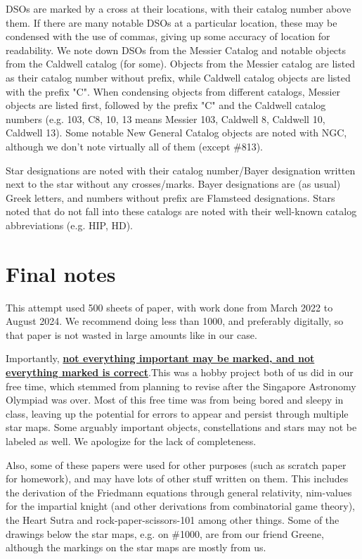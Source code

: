 \documentclass{article}
\begin{document}
DSOs are marked by a cross at their locations, with their catalog number above them. If there are many notable DSOs at a particular location, these may be condensed with the use of commas, giving up some accuracy of location for readability. We note down DSOs from the Messier Catalog and notable objects from the Caldwell catalog (for some). Objects from the Messier catalog are listed as their catalog number without prefix, while Caldwell catalog objects are listed with the prefix "C". When condensing objects from different catalogs, Messier objects are listed first, followed by the prefix "C" and the Caldwell catalog numbers (e.g. 103, C8, 10, 13 means Messier 103, Caldwell 8, Caldwell 10, Caldwell 13). Some notable New General Catalog objects are noted with NGC, although we don't note virtually all of them (except \#813).

Star designations are noted with their catalog number/Bayer designation written next to the star without any crosses/marks. Bayer designations are (as usual) Greek letters, and numbers without prefix are Flamsteed designations. Stars noted that do not fall into these catalogs are noted with their well-known catalog abbreviations (e.g. HIP, HD).
\section{Final notes}
This attempt used 500 sheets of paper, with work done from March 2022 to August 2024. We recommend doing less than 1000, and preferably digitally, so that paper is not wasted in large amounts like in our case.

Importantly, \ul{\textbf{not everything important may be marked, and not everything marked is correct}}.This was a hobby project both of us did in our free time, which stemmed from planning to revise after the Singapore Astronomy Olympiad was over. Most of this free time was from being bored and sleepy in class, leaving up the potential for errors to appear and persist through multiple star maps. Some arguably important objects, constellations and stars may not be labeled as well. We apologize for the lack of completeness.

Also, some of these papers were used for other purposes (such as scratch paper for homework), and may have lots of other stuff written on them. This includes the derivation of the Friedmann equations through general relativity, nim-values for the impartial knight (and other derivations from combinatorial game theory), the Heart Sutra and rock-paper-scissors-101 among other things. Some of the drawings below the star maps, e.g. on \#1000, are from our friend Greene, although the markings on the star maps are mostly from us.
\end{document}

